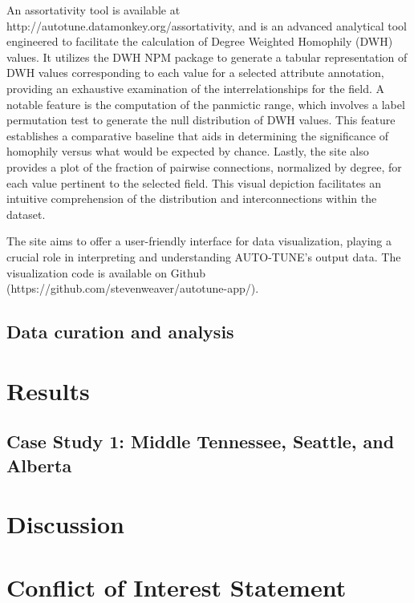 \documentclass[utf8]{FrontiersinHarvard} %
\begin{document}
An assortativity tool is available at http://autotune.datamonkey.org/assortativity, and is an advanced analytical tool engineered to facilitate the calculation of Degree Weighted Homophily (DWH) values. It utilizes the DWH NPM package to generate a tabular representation of DWH values corresponding to each value for a selected attribute annotation, providing an exhaustive examination of the interrelationships for the field.
A notable feature is the computation of the panmictic range, which involves a label permutation test to generate the null distribution of DWH values. This feature establishes a comparative baseline that aids in determining the significance of homophily versus what would be expected by chance.
Lastly, the site also provides a plot of the fraction of pairwise connections, normalized by degree, for each value pertinent to the selected field. This visual depiction facilitates an intuitive comprehension of the distribution and interconnections within the dataset.

The site aims to offer a user-friendly interface for data visualization, playing a crucial role in interpreting and understanding AUTO-TUNE's output data. The visualization code is available on Github (https://github.com/stevenweaver/autotune-app/).

\subsection{Data curation and analysis}

\section{Results}

\subsection{Case Study 1: Middle Tennessee, Seattle, and Alberta}


\section{Discussion}

\section*{Conflict of Interest Statement}
\end{document}
